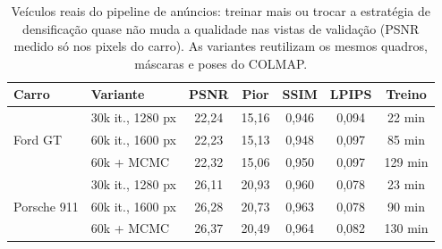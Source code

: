 \begin{table}[t]
\centering
\caption{Veículos reais do pipeline de anúncios: treinar mais ou trocar a estratégia de densificação quase não muda a qualidade nas vistas de validação (PSNR medido só nos pixels do carro). As variantes reutilizam os mesmos quadros, máscaras e poses do COLMAP.}
\label{tab:treino}
\setlength{\tabcolsep}{3pt}
\footnotesize
\begin{tabular}{l l c c c c c}
\toprule
Carro & Variante & PSNR & Pior & SSIM & LPIPS & Treino \\
\midrule
\multirow{3}{*}{Ford GT} & 30k it., 1280 px & 22,24 & 15,16 & 0,946 & 0,094 & 22 min \\
 & 60k it., 1600 px & 22,23 & 15,13 & 0,948 & 0,097 & 85 min \\
 & 60k + MCMC~\cite{kheradmand2024mcmc} & 22,32 & 15,06 & 0,950 & 0,097 & 129 min \\
\midrule
\multirow{3}{*}{Porsche 911} & 30k it., 1280 px & 26,11 & 20,93 & 0,960 & 0,078 & 23 min \\
 & 60k it., 1600 px & 26,28 & 20,73 & 0,963 & 0,078 & 90 min \\
 & 60k + MCMC~\cite{kheradmand2024mcmc} & 26,37 & 20,49 & 0,964 & 0,082 & 130 min \\
\bottomrule
\end{tabular}
\end{table}

